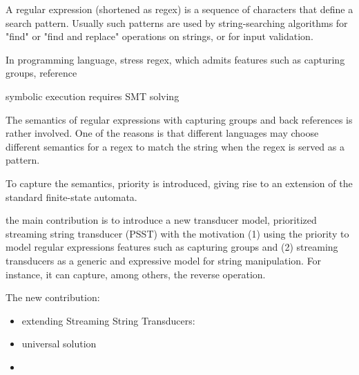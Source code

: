 A regular expression (shortened as regex) is a sequence of characters that define a search pattern. Usually such patterns are used by string-searching algorithms for "find" or "find and replace" operations on strings, or for input validation.  


In programming language, stress regex, which admits features such as capturing groups, reference


symbolic execution requires SMT solving 

The semantics of regular expressions with capturing groups and back references is rather involved. One of the reasons is that different languages may choose different semantics for a regex to match the string when the regex is served as a pattern. 

To capture the semantics, priority is introduced, giving rise to an extension of the standard finite-state automata. 

the main contribution is to introduce  a new transducer model, prioritized streaming string transducer (PSST) with the  motivation 
(1) using the priority to model regular expressions features such as capturing groups and (2) streaming transducers as a generic and expressive model for string manipulation. For instance, it can capture, among others, the reverse operation. 

The new contribution: 

\begin{itemize}
	\item extending Streaming String Transducers: \cite{FR17}
	
	\item  universal solution 
	
	\item 
\end{itemize} 
